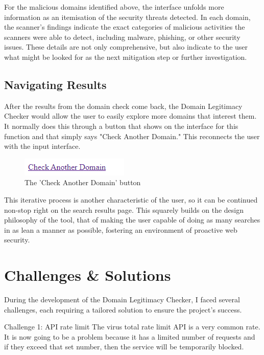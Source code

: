 For the malicious domains identified above, the interface unfolds more information as an itemisation of the security threats detected. In each domain, the scanner's findings indicate the exact categories of malicious activities the scanners were able to detect, including malware, phishing, or other security issues. These details are not only comprehensive, but also indicate to the user what might be looked for as the next mitigation step or further investigation.

\subsection{Navigating Results}

After the results from the domain check come back, the Domain Legitimacy Checker would allow the user to easily explore more domains that interest them. It normally does this through a button that shows on the interface for this function and that simply says "Check Another Domain." This reconnects the user with the input interface.

\begin{figure}[H]
    \centering
    \includegraphics[width=0.3\linewidth]{project/ii.png}
    \caption{The 'Check Another Domain' button}
    \label{fig:enter-label}
\end{figure}

This iterative process is another characteristic of the user, so it can be continued non-stop right on the search results page. This squarely builds on the design philosophy of the tool, that of making the user capable of doing as many searches in as lean a manner as possible, fostering an environment of proactive web security.




\section{Challenges \& Solutions}

During the development of the Domain Legitimacy Checker, I faced several challenges, each requiring a tailored solution to ensure the project's success.

Challenge 1: API rate limit
The virus total rate limit API is a very common rate. It is now going to be a problem because it has a limited number of requests and if they exceed that set number, then the service will be temporarily blocked.

